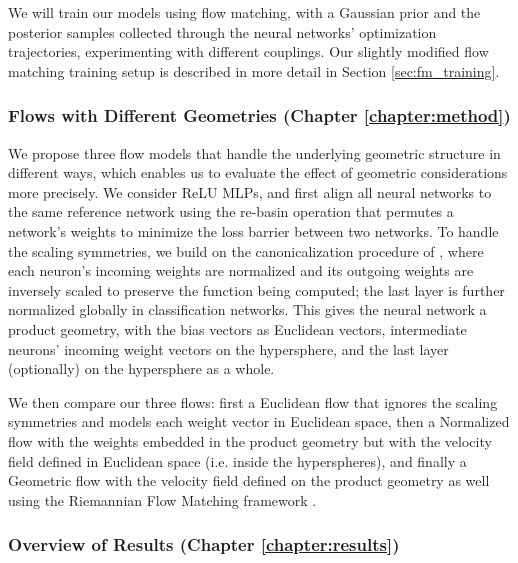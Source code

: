 We will train our models using flow matching, with a Gaussian prior and the posterior samples collected through the neural networks' optimization trajectories, experimenting with different couplings. Our slightly modified flow matching training setup is described in more detail in Section \ref{sec:fm_training}.

\subsubsection{Flows with Different Geometries (Chapter \ref{chapter:method})}

We propose three flow models that handle the underlying geometric structure in different ways, which enables us to evaluate the effect of geometric considerations more precisely. We consider ReLU MLPs, and first align all neural networks to the same reference network using the re-basin operation \citep{ainsworthGitReBasinMerging2023,penaReBasinImplicitSinkhorn2023} that permutes a network's weights to minimize the loss barrier between two networks.  To handle the scaling symmetries, we build on the canonicalization procedure of \citep{pittorinoDeepNetworksToroids2022}, where each neuron's incoming weights are normalized and its outgoing weights are inversely scaled to preserve the function being computed; the last layer is further normalized globally in classification networks. This gives the neural network a product geometry, with the bias vectors as Euclidean vectors, intermediate neurons' incoming weight vectors on the hypersphere, and the last layer (optionally) on the hypersphere as a whole. 

We then compare our three flows: first a Euclidean flow that ignores the scaling symmetries and models each weight vector in Euclidean space, then a Normalized flow with the weights embedded in the product geometry but with the velocity field defined in Euclidean space (i.e. inside the hyperspheres), and finally a Geometric flow with the velocity field defined on the product geometry as well using the Riemannian Flow Matching framework \citep{chenRiemannianFlowMatching2023}. 

\subsubsection{Overview of Results (Chapter \ref{chapter:results})}

